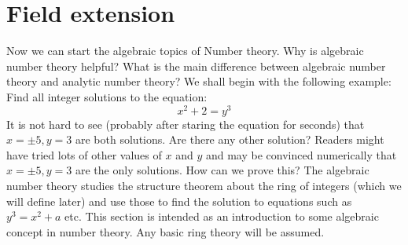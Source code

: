 \section{Field extension}
Now we can start the algebraic topics of Number theory. Why is algebraic number theory helpful? What is the main difference between algebraic number theory and analytic number theory? We shall begin with the following example:\\
Find all integer solutions to the equation:
$$x^2 + 2 = y^3$$
It is not hard to see (probably after staring the equation for seconds) that $x=\pm 5, y=3$ are both solutions. Are there any other solution? Readers might have tried lots of other values of $x$ and $y$ and may be convinced numerically that $x=\pm5, y=3$ are the only solutions. How can we prove this?
The algebraic number theory studies the structure theorem about the ring of integers (which we will define later) and use those to find the solution to equations such as $y^3=x^2+a$ etc.
This section is intended as an introduction to some algebraic concept in number theory.
Any basic ring theory will be assumed.
